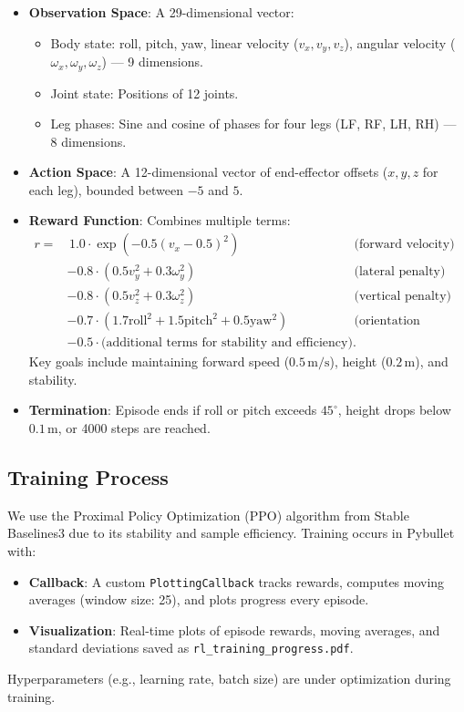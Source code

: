 \documentclass[a4paper,11pt]{article}
\begin{document}
\begin{itemize}
    \item \textbf{Observation Space}: A 29-dimensional vector:
    \begin{itemize}
        \item Body state: roll, pitch, yaw, linear velocity (\(v_x, v_y, v_z\)), angular velocity (\(\omega_x, \omega_y, \omega_z\)) — 9 dimensions.
        \item Joint state: Positions of 12 joints.
        \item Leg phases: Sine and cosine of phases for four legs (LF, RF, LH, RH) — 8 dimensions.
    \end{itemize}
    \item \textbf{Action Space}: A 12-dimensional vector of end-effector offsets (\(x, y, z\) for each leg), bounded between \(-5\) and \(5\).
    \item \textbf{Reward Function}: Combines multiple terms:
    \begin{align*}
        r = & \, 1.0 \cdot \exp(-0.5 (v_x - 0.5)^2) & \text{(forward velocity)} \\
            & - 0.8 \cdot (0.5 v_y^2 + 0.3 \omega_y^2) & \text{(lateral penalty)} \\
            & - 0.8 \cdot (0.5 v_z^2 + 0.3 \omega_z^2) & \text{(vertical penalty)} \\
            & - 0.7 \cdot (1.7 \text{roll}^2 + 1.5 \text{pitch}^2 + 0.5 \text{yaw}^2) & \text{(orientation penalty)} \\
            & - 0.5 \cdot \text{(additional terms for stability and efficiency)}.
    \end{align*}
    Key goals include maintaining forward speed (\(0.5 \, \text{m/s}\)), height (\(0.2 \, \text{m}\)), and stability.
    \item \textbf{Termination}: Episode ends if roll or pitch exceeds \(45^\circ\), height drops below \(0.1 \, \text{m}\), or 4000 steps are reached.
\end{itemize}

\subsection*{Training Process}

We use the Proximal Policy Optimization (PPO) algorithm from Stable Baselines3 due to its stability and sample efficiency. Training occurs in Pybullet with:
\begin{itemize}
    \item \textbf{Callback}: A custom \texttt{PlottingCallback} tracks rewards, computes moving averages (window size: 25), and plots progress every episode.
    \item \textbf{Visualization}: Real-time plots of episode rewards, moving averages, and standard deviations saved as \texttt{rl\_training\_progress.pdf}.
\end{itemize}
Hyperparameters (e.g., learning rate, batch size) are under optimization during training.
\end{document}
